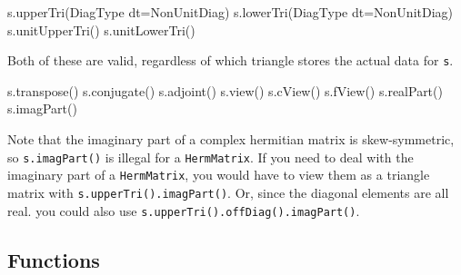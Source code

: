 \documentclass[twoside,letterpaper,11pt]{article}
\renewcommand{\tt}[1]{{\lstinline {#1}}}
\begin{document}
\begin{tmvcode}
s.upperTri(DiagType dt=NonUnitDiag)
s.lowerTri(DiagType dt=NonUnitDiag)
s.unitUpperTri()
s.unitLowerTri()
\end{tmvcode}
Both of these are valid, regardless
of which triangle stores the actual data for \tt{s}.
\begin{tmvcode}
s.transpose()
s.conjugate()
s.adjoint()
s.view()
s.cView()
s.fView()
s.realPart()
s.imagPart()
\end{tmvcode}
Note that the imaginary part of a complex hermitian matrix is skew-symmetric,
so \tt{s.imagPart()} is illegal for a \tt{HermMatrix}.  If you need to
deal with the imaginary part of a \tt{HermMatrix},
you would have to view them as a triangle matrix with \tt{s.upperTri().imagPart()}.  Or, 
since the diagonal elements are all real.
you could also use \tt{s.upperTri().offDiag().imagPart()}. 
\vspace{12pt}

\subsection{Functions}
\label{SymMatrix_Functions}
\end{document}
